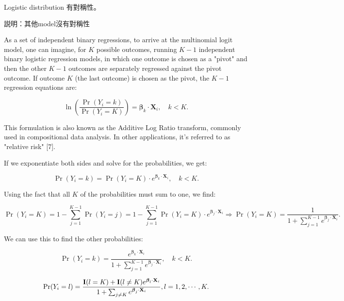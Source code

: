 \documentclass[UTF8,a4paper,10pt]{article}
\begin{document}
\pagebreak

\begin{Problem}[]{}
  Logistic distribution 有對稱性。

  説明：其他model沒有對稱性
\end{Problem}

As a set of independent binary regressions, to arrive at the multinomial logit model, one can imagine, for $K$ possible outcomes, running $K-1$ independent binary logistic regression models, in which one outcome is chosen as a "pivot" and then the other $K-1$ outcomes are separately regressed against the pivot outcome. If outcome $K$ (the last outcome) is chosen as the pivot, the $K-1$ regression equations are:

\begin{equation}
\ln\left(\frac{\Pr(Y_i=k)}{\Pr(Y_i=K)}\right) = \boldsymbol{\beta}_k \cdot \mathbf{X}_i, \quad k < K.
\end{equation}

This formulation is also known as the Additive Log Ratio transform, commonly used in compositional data analysis. In other applications, it's referred to as "relative risk" [7].

If we exponentiate both sides and solve for the probabilities, we get:

\begin{equation}
\Pr(Y_i=k) = \Pr(Y_i=K) \cdot e^{\boldsymbol{\beta}_k \cdot \mathbf{X}_i}, \quad k < K.
\end{equation}

Using the fact that all $K$ of the probabilities must sum to one, we find:

\begin{equation}
\Pr(Y_i=K) = 1 - \sum_{j=1}^{K-1} \Pr(Y_i=j) = 1 - \sum_{j=1}^{K-1} \Pr(Y_i=K) \cdot e^{\boldsymbol{\beta}_j \cdot \mathbf{X}_i} \Rightarrow \Pr(Y_i=K) = \frac{1}{1 + \sum_{j=1}^{K-1} e^{\boldsymbol{\beta}_j \cdot \mathbf{X}_i}}.
\end{equation}

We can use this to find the other probabilities:

\begin{equation}
\Pr(Y_i=k) = \frac{e^{\boldsymbol{\beta}_k \cdot \mathbf{X}_i}}{1 + \sum_{j=1}^{K-1} e^{\boldsymbol{\beta}_j \cdot \mathbf{X}_i}}, \quad k < K.
\end{equation}

\begin{equation}
  \Pr(Y_i=l) = \frac{\operatorname{\mathbf{I}}(l = K)+\operatorname{\mathbf{I}}(l\neq K)e^{\boldsymbol{\beta}_l \cdot \mathbf{X}_i}}{1 + \sum_{j\neq K} e^{\boldsymbol{\beta}_j \cdot \mathbf{X}_i}}, l = 1,2,\cdots,K.
  \end{equation}
\end{document}
